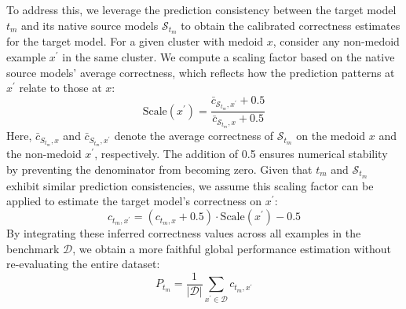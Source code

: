 To address this, we leverage the prediction consistency between the target model $t_m$ and its native source models $\mathcal{S}_{t_m}$ to obtain the calibrated correctness estimates for the target model. For a given cluster with medoid $x$, consider any non-medoid example $x^{\prime}$ in the same cluster. We compute a scaling factor based on the native source models' average correctness, which reflects how the prediction patterns at $x^{\prime}$ relate to those at $x$:
\begin{equation}
    \mathrm{Scale}(x^{\prime})=\frac{\bar{c}_{\mathcal{S}_{t_m},x^{\prime}}+0.5}{\bar{c}_{\mathcal{S}_{t_m},x}+0.5}
\end{equation}
Here, $\bar{c}_{S_{t_m},x}$ and $\bar{c}_{S_{t_m},x^{\prime}}$ denote the average correctness of $\mathcal{S}_{t_m}$ on the medoid $x$ and the non-medoid $x^{\prime}$, respectively. The addition of 0.5 ensures numerical stability by preventing the denominator from becoming zero. Given that $t_m$ and $\mathcal{S}_{t_m}$ exhibit similar prediction consistencies, we assume this scaling factor can be applied to estimate the target model's correctness on $x^{\prime}{:}$
\begin{equation}
    c_{t_m,x^{\prime}}=(c_{t_m,x}+0.5)\cdot\mathrm{Scale}(x^{\prime})-0.5
\end{equation}
By integrating these inferred correctness values across all examples in the benchmark $\mathcal{D}$, we obtain a more faithful global performance estimation without re-evaluating the entire dataset:
\begin{equation}
    P_{t_m}=\frac1{|\mathcal{D}|}\sum_{x^{\prime}\in\mathcal{D}}c_{t_m,x^{\prime}}
\end{equation}





